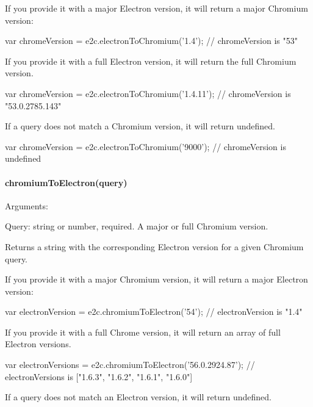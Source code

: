 If you provide it with a major Electron version, it will return a major Chromium version\+:


\begin{DoxyCode}
var chromeVersion = e2c.electronToChromium('1.4');
// chromeVersion is "53"
\end{DoxyCode}


If you provide it with a full Electron version, it will return the full Chromium version.


\begin{DoxyCode}
var chromeVersion = e2c.electronToChromium('1.4.11');
// chromeVersion is "53.0.2785.143"
\end{DoxyCode}


If a query does not match a Chromium version, it will return {\ttfamily undefined}.


\begin{DoxyCode}
var chromeVersion = e2c.electronToChromium('9000');
// chromeVersion is undefined
\end{DoxyCode}


\paragraph*{{\ttfamily chromium\+To\+Electron(query)}}

Arguments\+:
\begin{DoxyItemize}
\item Query\+: string or number, required. A major or full Chromium version.
\end{DoxyItemize}

Returns a string with the corresponding Electron version for a given Chromium query.

If you provide it with a major Chromium version, it will return a major Electron version\+:


\begin{DoxyCode}
var electronVersion = e2c.chromiumToElectron('54');
// electronVersion is "1.4"
\end{DoxyCode}


If you provide it with a full Chrome version, it will return an array of full Electron versions.


\begin{DoxyCode}
var electronVersions = e2c.chromiumToElectron('56.0.2924.87');
// electronVersions is ["1.6.3", "1.6.2", "1.6.1", "1.6.0"]
\end{DoxyCode}


If a query does not match an Electron version, it will return {\ttfamily undefined}.


